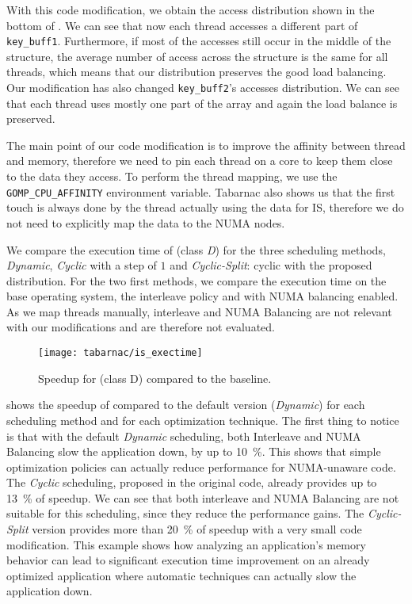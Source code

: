 With this code modification, we obtain the access distribution shown in the bottom of .
We can see that now each thread accesses a different part of \texttt{key\_buff1}.
Furthermore, if most of the accesses still occur in the middle of the structure, the average number of access across the structure is the same for all threads, which means that our distribution preserves the good load balancing.
Our modification has also changed \texttt{key\_buff2}'s accesses distribution.
We can see that each thread uses mostly one part of the array and again the load balance is preserved.

The main point of our code modification is to improve the affinity between thread and memory, therefore we need to pin each thread on a core to keep them close to the data they access.
To perform the thread mapping, we use the \texttt{GOMP\_CPU\_AFFINITY} environment variable.
\gls{Tabarnac} also shows us that the first touch is always done by the thread actually using the data for IS, therefore we do not need to explicitly map the data to the \gls{NUMA} nodes.

We compare the execution time of \IS (class \emph{D}) for the three scheduling methods, \emph{Dynamic}, \emph{Cyclic} with a step of $1$ and \emph{Cyclic-Split}: cyclic with the proposed distribution.
For the two first methods, we compare the execution time on the base operating system, the interleave policy and with \gls{NUMA} balancing enabled.
As we map threads manually, interleave and \gls{NUMA} Balancing are not relevant with our modifications and are therefore not evaluated.

\begin{figure}[htb]
    \centering
    \texttt{[image: tabarnac/is\_exectime]}
    \caption[Speedup for \IS.]{Speedup for \IS (class D) compared to the baseline.}
\label{fig:is-res}
\end{figure}

 shows the speedup of \IS compared to the default version (\emph{Dynamic}) for each scheduling method and for each optimization technique.
The first thing to notice is that with the default \emph{Dynamic} scheduling, both Interleave and \gls{NUMA} Balancing slow the application down, by up to \SI{10}{\%}.
This shows that simple optimization policies can actually reduce performance for \gls{NUMA}-unaware code.
The \emph{Cyclic} scheduling, proposed in the original code, already provides up to \SI{13}{\%} of speedup.
We can see that both interleave and \gls{NUMA} Balancing are not suitable for this scheduling, since they reduce the performance gains.
The \emph{Cyclic-Split} version provides more than \SI{20}{\%} of speedup with a very small code modification.
This example shows how analyzing an application's memory behavior can lead to significant execution time improvement on an already optimized application where automatic techniques can actually slow the application down.


